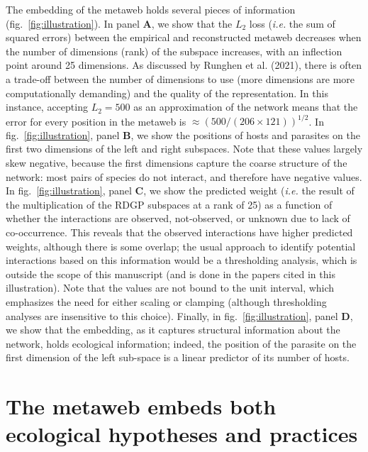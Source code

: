 \documentclass[10pt,oneside]{article}
\begin{document}
The embedding of the metaweb holds several pieces of information
(fig.~\ref{fig:illustration}). In panel \textbf{A}, we show that the
\(L_2\) loss (\emph{i.e.} the sum of squared errors) between the
empirical and reconstructed metaweb decreases when the number of
dimensions (rank) of the subspace increases, with an inflection point
around 25 dimensions. As discussed by Runghen et al. (2021), there is
often a trade-off between the number of dimensions to use (more
dimensions are more computationally demanding) and the quality of the
representation. In this instance, accepting \(L_2 = 500\) as an
approximation of the network means that the error for every position in
the metaweb is \(\approx \left(500/(206\times 121)\right)^{1/2}\). In
fig.~\ref{fig:illustration}, panel \textbf{B}, we show the positions of
hosts and parasites on the first two dimensions of the left and right
subspaces. Note that these values largely skew negative, because the
first dimensions capture the coarse structure of the network: most pairs
of species do not interact, and therefore have negative values. In
fig.~\ref{fig:illustration}, panel \textbf{C}, we show the predicted
weight (\emph{i.e.} the result of the multiplication of the RDGP
subspaces at a rank of 25) as a function of whether the interactions are
observed, not-observed, or unknown due to lack of co-occurrence. This
reveals that the observed interactions have higher predicted weights,
although there is some overlap; the usual approach to identify potential
interactions based on this information would be a thresholding analysis,
which is outside the scope of this manuscript (and is done in the papers
cited in this illustration). Note that the values are not bound to the
unit interval, which emphasizes the need for either scaling or clamping
(although thresholding analyses are insensitive to this choice).
Finally, in fig.~\ref{fig:illustration}, panel \textbf{D}, we show that
the embedding, as it captures structural information about the network,
holds ecological information; indeed, the position of the parasite on
the first dimension of the left sub-space is a linear predictor of its
number of hosts.

\hypertarget{the-metaweb-embeds-both-ecological-hypotheses-and-practices}{%
\section{The metaweb embeds both ecological hypotheses and
practices}\label{the-metaweb-embeds-both-ecological-hypotheses-and-practices}}
\end{document}
